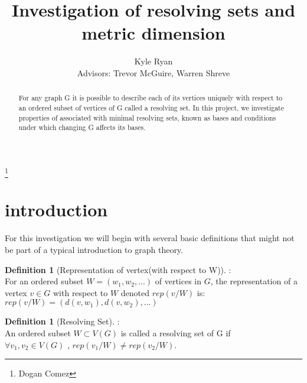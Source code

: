 \documentclass[11pt]{amsart}
\theoremstyle{plain}  %
\theoremstyle{definition}
\newtheorem{defin}[thm]{{Definition}}
\theoremstyle{remark}
\numberwithin{equation}{thm}
\begin{document}
\title[Abstract Algebra Project]{Investigation of resolving sets and metric dimension}
\thanks{Dogan Comez}
\author[K.~ R. Ryan]{Kyle Ryan\\{Advisors: Trevor McGuire, Warren Shreve}}


\address{Department of Mathematics 2750\\ North Dakota State University\\PO BOX 6050\\ Fargo, ND 58108-6050\\ USA}






\maketitle


\begin{abstract}
        For any graph G it is possible to describe each of its vertices uniquely with respect to an ordered subset of vertices of G called a resolving set.
    In this project, we investigate properties of associated with minimal resolving sets, known as bases and conditions under which changing G affects its bases. 
\end{abstract}


\section{introduction}

    For this investigation we will begin with several basic definitions that might not be part of a typical introduction to graph theory.

 \begin{defin}[Representation of vertex(with respect to W)]:\\
    For an ordered subset $W=(w_1, w_2, ...)$ of vertices in $G$, the representation of a vertex $v \in G$ with respect to $W$ denoted $rep(v/W)$ is: \\
  $rep(v/W)=(d(v,w_1), d(v,w_2), ...)$
 \end{defin}
    
 \begin{defin}[Resolving Set]:\\
  An ordered subset $W \subset V(G)$ is called a resolving set of G if\\ $\forall v_1, v_2 \in V(G)$  , $rep(v_1/W) \neq  rep(v_2/W)$.
 \end{defin}
 
\end{document}
